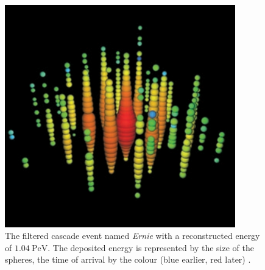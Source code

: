 \begin{figure}
    \centering
    \includegraphics[width=10cm]{Plots/01_7_icecube/cascade.png}
    \caption{The filtered cascade event named \textit{Ernie} with a reconstructed energy of $\SI{1.04}{\peta\electronvolt}$. The deposited energy is represented by the size of the spheres, the time of arrival by the colour (blue earlier, red later) \cite{spiering}.}
    \label{fig:cascade}
\end{figure}
